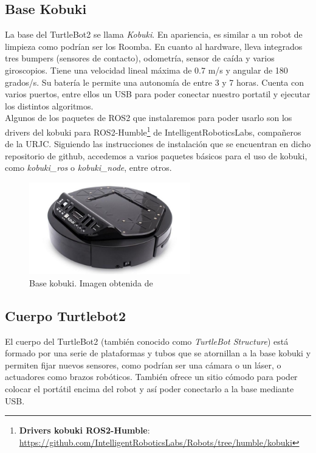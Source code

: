 \subsection{Base Kobuki}
\label{subsec:turtlebot2_base}

La base del TurtleBot2 se llama \textit{Kobuki}. En apariencia, es similar a un robot de limpieza como podrían ser los Roomba. En cuanto al hardware,
lleva integrados tres bumpers (sensores de contacto), odometría, sensor de caída y varios giroscopios. Tiene una velocidad lineal máxima de 0.7 m/s y
angular de 180 grados/s. Su batería le permite una autonomía de entre 3 y 7 horas. Cuenta con varios puertos, entre ellos un USB para poder conectar nuestro
portatil y ejecutar los distintos algoritmos.\\

Algunos de los paquetes de ROS2 que instalaremos para poder usarlo son los drivers del kobuki para
ROS2-Humble\footnote{\textbf{Drivers kobuki ROS2-Humble}: \url{https://github.com/IntelligentRoboticsLabs/Robots/tree/humble/kobuki}} de IntelligentRoboticsLabs,
compañeros de la URJC. Siguiendo las instrucciones de instalación que se encuentran en dicho repositorio de github, accedemos a varios paquetes básicos
para el uso de kobuki, como \textit{kobuki\_ros} o \textit{kobuki\_node}, entre otros.

\begin{figure} [H]
    \begin{center}
        \includegraphics[width=7cm]{figs/c3/kobuki_base.jpg}
    \end{center}
    \caption[Kobuki base]{Base kobuki. Imagen obtenida de \cite{kobuki_base}}
    \label{fig:kobuki_base}
\end{figure}

\newpage

\subsection{Cuerpo Turtlebot2}
\label{subsec:turtlebot2_body}
El cuerpo del TurtleBot2 (también conocido como \textit{TurtleBot Structure}) está formado por una serie de plataformas y tubos que se atornillan a la
base kobuki y permiten fijar nuevos sensores, como podrían ser una cámara o un láser, o actuadores como brazos robóticos. También ofrece un sitio cómodo
para poder colocar el portátil encima del robot y así poder conectarlo a la base mediante USB. 


